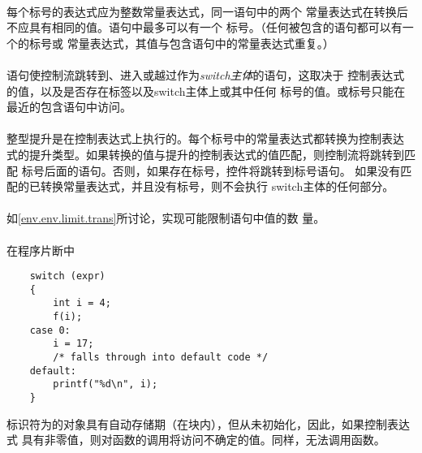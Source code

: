\paragraph{}
每个标号的表达式应为整数常量表达式，同一语句中的两个
常量表达式在转换后不应具有相同的值。语句中最多可以有一个
标号。（任何被包含的语句都可以有一个的标号或
常量表达式，其值与包含语句中的常量表达式重复。）

\semantic
\paragraph{}
语句使控制流跳转到、进入或越过作为\textit{switch主体}的语句，这取决于
控制表达式的值，以及是否存在标签以及switch主体上或其中任何
标号的值。或标号只能在最近的包含语句中访问。

\paragraph{}
整型提升是在控制表达式上执行的。每个标号中的常量表达式都转换为控制表达
式的提升类型。如果转换的值与提升的控制表达式的值匹配，则控制流将跳转到匹配
标号后面的语句。否则，如果存在标号，控件将跳转到标号语句。
如果没有匹配的已转换常量表达式，并且没有标号，则不会执行
switch主体的任何部分。

\implimit
\paragraph{}
如\ref{env.env.limit.trans}所讨论，实现可能限制语句中值的数
量。

\paragraph{}
\ex* 在程序片断中
\begin{lstlisting}
    switch (expr)
    {
        int i = 4;
        f(i);
    case 0:
        i = 17;
        /* falls through into default code */
    default:
        printf("%d\n", i);
    }
\end{lstlisting}
标识符为的对象具有自动存储期（在块内），但从未初始化，因此，如果控制表达式
具有非零值，则对函数的调用将访问不确定的值。同样，无法调用函数。

\syntax
\paragraph{}

